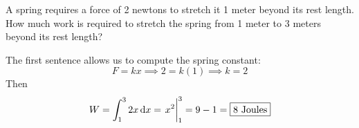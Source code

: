 \documentclass[12pt,answers]{exam}
\begin{document}
\begin{questions}

\question[8]
A spring requires a force of 2 newtons to stretch it 1 meter beyond its rest length. How much work is required to stretch the spring from 1 meter to 3 meters beyond its rest length?
\begin{solution}
    The first sentence allows us to compute the spring constant:
\[
    F =  kx \implies 2= k(1) \implies k = 2
\]
Then
\[
    W 
    = \int_1^3 2 x \dif x 
    = \eval{x^2}_1^3 = 9-1 = \boxed{8 \text{ Joules}} 
\]
\end{solution}


\end{questions}
\end{document}
